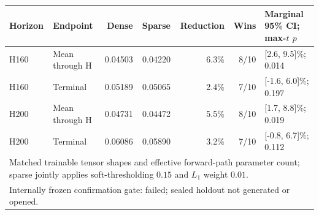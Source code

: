\begin{tabular}{llrrrrl}
\toprule
Horizon & Endpoint & Dense & Sparse & Reduction & Wins & Marginal 95\% CI; max-$t$ $p$ \\
\midrule
H160 & Mean through H & 0.04503 & 0.04220 & 6.3\% & 8/10 & [2.6, 9.5]\%; 0.014 \\
H160 & Terminal & 0.05189 & 0.05065 & 2.4\% & 7/10 & [-1.6, 6.0]\%; 0.197 \\
H200 & Mean through H & 0.04731 & 0.04472 & 5.5\% & 8/10 & [1.7, 8.8]\%; 0.019 \\
H200 & Terminal & 0.06086 & 0.05890 & 3.2\% & 7/10 & [-0.8, 6.7]\%; 0.112 \\
\midrule
\multicolumn{7}{l}{\footnotesize Matched trainable tensor shapes and effective forward-path parameter count; sparse jointly applies soft-thresholding $0.15$ and $L_1$ weight $0.01$.} \\
\multicolumn{7}{l}{\footnotesize Internally frozen confirmation gate: failed; sealed holdout not generated or opened.} \\
\bottomrule
\end{tabular}
